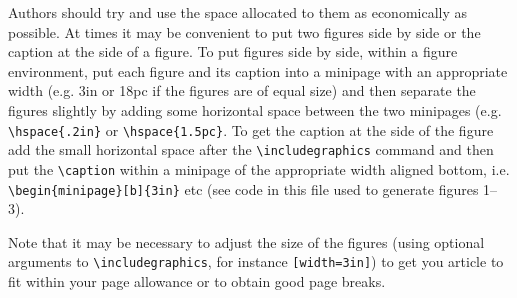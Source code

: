 \documentclass[a4paper]{jpconf}
\begin{document}
Authors should try and use the space allocated to them as economically as possible. At times it may be convenient to put two figures side by side or the caption at the side of a figure. To put figures side by side, within a figure environment, put each figure and its caption into a minipage with an appropriate width (e.g. 3in or 18pc if the figures are of equal size) and then separate the figures slightly by adding some horizontal space between the two minipages (e.g. \verb"\hspace{.2in}" or \verb"\hspace{1.5pc}". To get the caption at the side of the figure add the small horizontal space after the \verb"\includegraphics" command and then put the \verb"\caption" within a minipage of the appropriate width aligned bottom, i.e. \verb"\begin{minipage}[b]{3in}" etc (see code in this file used to generate figures 1--3).

Note that it may be necessary to adjust the size of the figures (using optional arguments to \verb"\includegraphics", for instance \verb"[width=3in]") to get you article to fit within your page allowance or to obtain good page breaks.
\end{document}
